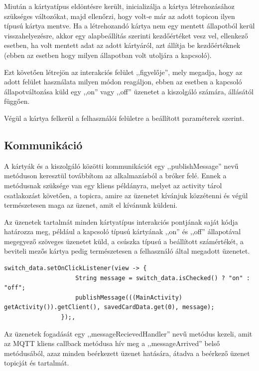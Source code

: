 \documentclass[
]{thesis-ekf}
\theoremstyle{definition}
\theoremstyle{remark}
\begin{document}
Miután a kártyatípus eldöntésre került, inicializálja a kártya létrehozásához szükséges változókat, majd ellenőrzi, hogy volt-e már az adott topicon ilyen típusú kártya mentve.
Ha a létrehozandó kártya nem egy mentett állapotból kerül visszahelyezésre, akkor egy alapbeállítás 
szerinti kezdőértéket vesz vel, ellenkező esetben, ha volt mentett adat az adott kártyáról, azt állítja be kezdőértéknek
(ebben az esetben hogy milyen állapotban volt utoljára a kapcsoló).

Ezt követően létrejön az interakciós felület ,,figyelője'', mely megadja, hogy az adott felület használata
milyen módon reagáljon, ebben az esetben a kapcsoló állapotváltozása küld egy ,,on'' vagy ,,off'' üzenetet a
kiszolgáló számára, állásától függően.

Végül a kártya felkerül a felhasználói felületre a beállított paraméterek szerint.

\subsection{Kommunikáció}
A kártyák és a kiszolgáló közötti kommunikációt egy ,,publishMessage'' nevű metóduson keresztül továbbítom
az alkalmazásból a bróker felé. Ennek a metódusnak szüksége van egy kliens példányra, melyet az activity tárol
csatlakozást követően, a topicra, amire az üzenetet kívánjuk közzétenni és végül természetesen maga az üzenet, amit
el kívánunk küldeni.

Az üzenetek tartalmát minden kártyatípus interakciós pontjának saját kódja határozza meg, például
a kapcsoló típusú kártyának ,,on'' és ,,off'' állapotával megegyező szöveges üzenetet küld, a csúszka típusú
a beállított számértékét, a beviteli mezős kártya pedig természetesen a felhasználó által megadott üzenetet.

\lstset{language=Java}
\begin{lstlisting}[frame=single]
switch_data.setOnClickListener(view -> {
                    String message = switch_data.isChecked() ? "on" : "off";
                    publishMessage(((MainActivity) getActivity()).getClient(), savedCardData.get(0), message);
                });,
\end{lstlisting}

Az üzenetek fogadását egy ,,messageRecievedHandler'' nevű metódus kezeli, amit az MQTT kliens callback metódusa
hív meg a ,,messageArrived'' belső metódusából, azaz minden beérkezett üzenet hatására, átadva a beérkező üzenet topicját és tartalmát.
\end{document}
